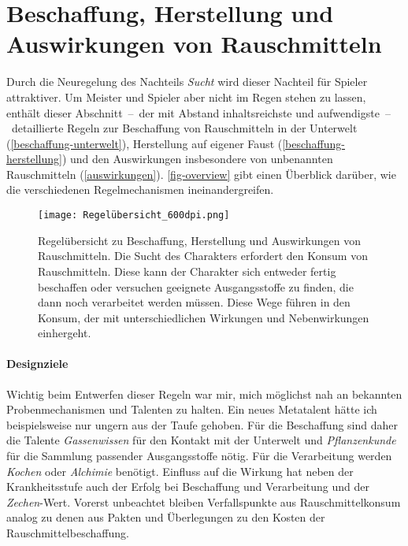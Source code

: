 \section{Beschaffung, Herstellung und Auswirkungen von Rauschmitteln}
Durch die Neuregelung des Nachteils \emph{Sucht} wird dieser Nachteil für Spieler attraktiver. Um Meister und Spieler aber nicht im Regen stehen zu lassen, enthält dieser Abschnitt~--~der mit Abstand inhaltsreichste und aufwendigste~--~detaillierte Regeln zur Beschaffung von Rauschmitteln in der Unterwelt (\vref{beschaffung-unterwelt}), Herstellung auf eigener Faust (\vref{beschaffung-herstellung}) und den Auswirkungen insbesondere von unbenannten Rauschmitteln (\vref{auswirkungen}). \vref{fig-overview} gibt einen Überblick darüber, wie die verschiedenen Regelmechanismen ineinandergreifen.

\begin{figure}
	\begin{center}
		\texttt{[image: Regelübersicht\_600dpi.png]}
		\caption[Regelübersicht zu Beschaffung, Herstellung und Auswirkungen von Rauschmitteln]{Regelübersicht zu Beschaffung, Herstellung und Auswirkungen von Rauschmitteln. Die Sucht des Charakters erfordert den Konsum von Rauschmitteln. Diese kann der Charakter sich entweder fertig beschaffen oder versuchen geeignete Ausgangsstoffe zu finden, die dann noch verarbeitet werden müssen. Diese Wege führen in den Konsum, der mit unterschiedlichen Wirkungen und Nebenwirkungen einhergeht.\label{fig-overview}}
	\end{center}
\end{figure}

\paragraph{Designziele}
Wichtig beim Entwerfen dieser Regeln war mir, mich möglichst nah an bekannten Probenmechanismen und Talenten zu halten. Ein neues Metatalent hätte ich beispielsweise nur ungern aus der Taufe gehoben. Für die Beschaffung sind daher die Talente \emph{Gassenwissen} für den Kontakt mit der Unterwelt und \emph{Pflanzenkunde} für die Sammlung passender Ausgangsstoffe nötig. Für die Verarbeitung werden \emph{Kochen} oder \emph{Alchimie} benötigt. Einfluss auf die Wirkung hat neben der Krankheitsstufe auch der Erfolg bei Beschaffung und Verarbeitung und der \emph{Zechen}-Wert. Vorerst unbeachtet bleiben Verfallspunkte aus Rauschmittelkonsum analog zu denen aus Pakten \cite[S.~390]{WdZ} und Überlegungen zu den Kosten der Rauschmittelbeschaffung.

